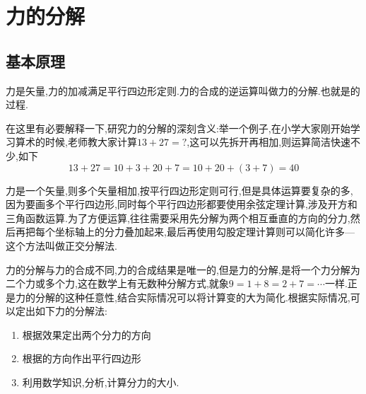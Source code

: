 \section{力的分解}
\subsection{基本原理}
力是矢量,力的加减满足平行四边形定则.力的合成的逆运算叫做力的分解.也就是的过程.

在这里有必要解释一下,研究力的分解的深刻含义:举一个例子,在小学大家刚开始学习算术的时候,老师教大家计算$13+27=?$,这可以先拆开再相加,则运算简洁快速不少,如下
$$13+27=10+3+20+7=10+20+(3+7)=40$$

力是一个矢量,则多个矢量相加,按平行四边形定则可行,但是具体运算要复杂的多,因为要画多个平行四边形,同时每个平行四边形都要使用余弦定理计算,涉及开方和三角函数运算.为了方便运算,往往需要采用先分解为两个相互垂直的方向的分力,然后再把每个坐标轴上的分力叠加起来,最后再使用勾股定理计算则可以简化许多---这个方法叫做正交分解法.

力的分解与力的合成不同,力的合成结果是唯一的,但是力的分解,是将一个力分解为二个力或多个力,这在数学上有无数种分解方式,就象$9=1+8=2+7=\cdots $一样.正是力的分解的这种任意性,结合实际情况可以将计算变的大为简化.根据实际情况,可以定出如下力的分解法:
\begin{enumerate}
  \item 根据效果定出两个分力的方向
  \item 根据的方向作出平行四边形
  \item 利用数学知识,分析,计算分力的大小.
\end{enumerate}
